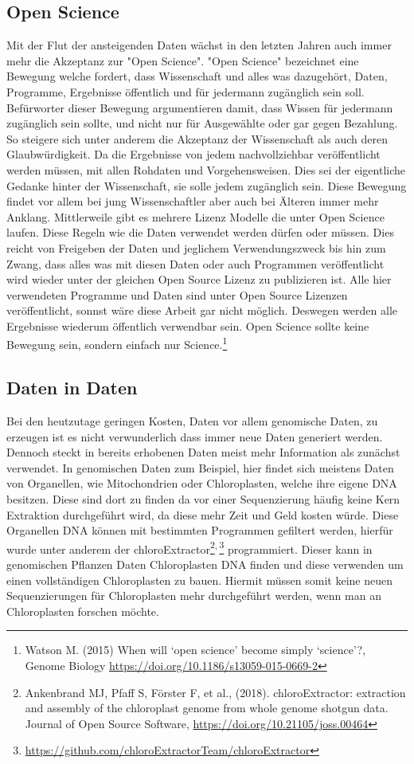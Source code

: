 \documentclass{scrartcl}
\begin{document}
\subsection{Open Science}
\label{sec-2-3}
Mit der Flut der ansteigenden Daten wächst in den letzten Jahren auch immer mehr die Akzeptanz zur "Open Science".
"Open Science" bezeichnet eine Bewegung welche fordert, dass Wissenschaft und alles was dazugehört, Daten, Programme, Ergebnisse öffentlich und für jedermann 
zugänglich sein soll. Befürworter dieser Bewegung argumentieren damit, dass Wissen für jedermann zugänglich sein sollte, und nicht nur für Ausgewählte oder gar
gegen Bezahlung. So steigere sich unter anderem die Akzeptanz der Wissenschaft als auch deren Glaubwürdigkeit. Da die Ergebnisse von jedem nachvollziehbar 
veröffentlicht werden müssen, mit allen Rohdaten und Vorgehensweisen. Dies sei der eigentliche Gedanke hinter der Wissenschaft, sie solle jedem zugänglich sein.
Diese Bewegung findet vor allem bei jung Wissenschaftler aber auch bei Älteren immer mehr Anklang. Mittlerweile gibt es mehrere Lizenz Modelle die unter
Open Science laufen. Diese Regeln wie die Daten verwendet werden dürfen oder müssen. Dies reicht von Freigeben der Daten und jeglichem Verwendungszweck bis hin
zum Zwang, dass alles was mit diesen Daten oder auch Programmen veröffentlicht wird wieder unter der gleichen Open Source Lizenz zu publizieren ist.
Alle hier verwendeten Programme und Daten sind unter Open Source Lizenzen veröffentlicht, sonnst wäre diese Arbeit gar nicht möglich. 
Deswegen werden alle Ergebnisse wiederum öffentlich verwendbar sein. Open Science sollte keine Bewegung sein, sondern einfach nur Science.\footnote{Watson M. (2015) When will ‘open science’ become simply ‘science’?, Genome Biology \url{https://doi.org/10.1186/s13059-015-0669-2}}


\subsection{Daten in Daten}
\label{sec-2-4}
Bei den heutzutage geringen Kosten, Daten vor allem genomische Daten, zu erzeugen ist es nicht verwunderlich dass immer neue Daten generiert werden.
Dennoch steckt in bereits erhobenen Daten meist mehr Information als zunächst verwendet. In genomischen Daten zum Beispiel, hier findet sich meistens Daten 
von Organellen, wie Mitochondrien oder Chloroplasten, welche ihre eigene DNA besitzen. Diese sind dort zu finden da vor einer Sequenzierung häufig keine 
Kern Extraktion durchgeführt wird, da diese mehr Zeit und Geld kosten würde. Diese Organellen DNA können mit bestimmten Programmen gefiltert werden, hierfür 
wurde unter anderem der chloroExtractor\footnote{Ankenbrand MJ, Pfaff S, Förster F, et al., (2018). chloroExtractor: extraction and assembly of the chloroplast genome from whole genome shotgun data. Journal of Open Source Software, \url{https://doi.org/10.21105/joss.00464}}\textsuperscript{,}\,\footnote{\url{https://github.com/chloroExtractorTeam/chloroExtractor}} programmiert. Dieser kann in genomischen Pflanzen Daten Chloroplasten DNA finden und diese verwenden um einen vollständigen
Chloroplasten zu bauen. Hiermit müssen somit keine neuen Sequenzierungen für Chloroplasten mehr durchgeführt werden, wenn man an Chloroplasten forschen möchte.
\end{document}
